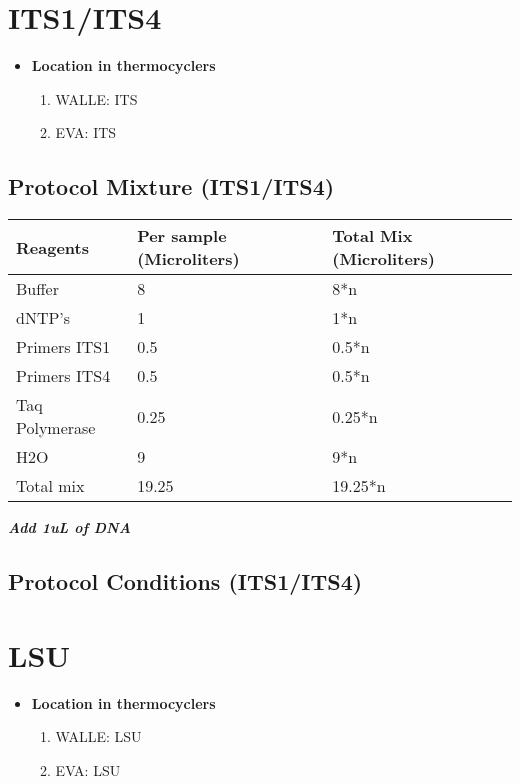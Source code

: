 \documentclass[
]{book}
\providecommand{\tightlist}{%
  \setlength{\itemsep}{0pt}\setlength{\parskip}{0pt}}
\begin{document}
\hypertarget{its1its4}{%
\section{ITS1/ITS4}\label{its1its4}}

\begin{itemize}
\tightlist
\item
  \textbf{Location in thermocyclers}

  \begin{enumerate}
  \def\labelenumi{\arabic{enumi}.}
  \tightlist
  \item
    WALLE: ITS
  \item
    EVA: ITS
  \end{enumerate}
\end{itemize}

\hypertarget{protocol-mixture-its1its4}{%
\subsection{Protocol Mixture (ITS1/ITS4)}\label{protocol-mixture-its1its4}}

\begin{longtable}[]{@{}lll@{}}
\toprule
Reagents & Per sample (Microliters) & Total Mix (Microliters) \\
\midrule
\endhead
Buffer & 8 & 8*n \\
dNTP's & 1 & 1*n \\
Primers ITS1 & 0.5 & 0.5*n \\
Primers ITS4 & 0.5 & 0.5*n \\
Taq Polymerase & 0.25 & 0.25*n \\
H2O & 9 & 9*n \\
Total mix & 19.25 & 19.25*n \\
\bottomrule
\end{longtable}

\textbf{\emph{Add 1uL of DNA}}

\hypertarget{protocol-conditions-its1its4}{%
\subsection{Protocol Conditions (ITS1/ITS4)}\label{protocol-conditions-its1its4}}

\hypertarget{lsu}{%
\section{LSU}\label{lsu}}

\begin{itemize}
\tightlist
\item
  \textbf{Location in thermocyclers}

  \begin{enumerate}
  \def\labelenumi{\arabic{enumi}.}
  \tightlist
  \item
    WALLE: LSU
  \item
    EVA: LSU
  \end{enumerate}
\end{itemize}
\end{document}
